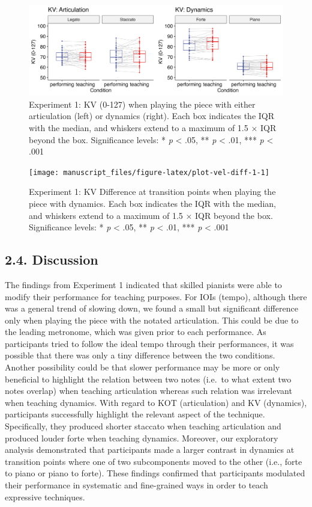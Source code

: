 \documentclass[
  english,
  man,floatsintext]{apa6}
\begin{document}
\begin{figure}
\includegraphics[width=1\linewidth]{manuscript_files/figure-latex/plot-vel-1-1} \caption{\label{fig:vel-1}Experiment 1: KV (0-127) when playing the piece with either articulation (left) or dynamics (right). Each box indicates the IQR with the median, and whiskers extend to a maximum of 1.5 × IQR beyond the box. Significance levels: * \textit{p} < .05, ** \textit{p} < .01, *** \textit{p} < .001}\label{fig:plot-vel-1}
\end{figure}

\begin{figure}
\texttt{[image: manuscript\_files/figure-latex/plot-vel-diff-1-1]} \caption{\label{fig:vel-diff-1}Experiment 1: KV Difference at transition points when playing the piece with dynamics. Each box indicates the IQR with the median, and whiskers extend to a maximum of 1.5 × IQR beyond the box. Significance levels: * \textit{p} < .05, ** \textit{p} < .01, *** \textit{p} < .001}\label{fig:plot-vel-diff-1}
\end{figure}

\hypertarget{discussion}{%
\subsection{2.4. Discussion}\label{discussion}}

The findings from Experiment 1 indicated that skilled pianists were able to modify their performance for teaching purposes. For IOIs (tempo), although there was a general trend of slowing down, we found a small but significant difference only when playing the piece with the notated articulation. This could be due to the leading metronome, which was given prior to each performance. As participants tried to follow the ideal tempo through their performances, it was possible that there was only a tiny difference between the two conditions. Another possibility could be that slower performance may be more or only beneficial to highlight the relation between two notes (i.e.~to what extent two notes overlap) when teaching articulation whereas such relation was irrelevant when teaching dynamics. With regard to KOT (articulation) and KV (dynamics), participants successfully highlight the relevant aspect of the technique. Specifically, they produced shorter staccato when teaching articulation and produced louder forte when teaching dynamics. Moreover, our exploratory analysis demonstrated that participants made a larger contrast in dynamics at transition points where one of two subcomponents moved to the other (i.e., forte to piano or piano to forte). These findings confirmed that participants modulated their performance in systematic and fine-grained ways in order to teach expressive techniques.
\end{document}
